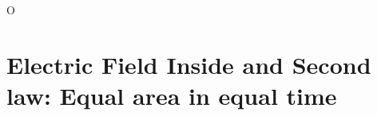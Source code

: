 \documentclass{../../oss-handout}
\begin{document}
O%

\section{Electric Field Inside and Second law: Equal area in equal time}
\end{document}
